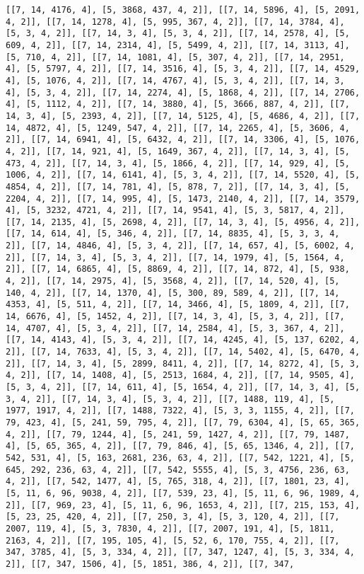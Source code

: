 \documentclass[12pt,fleqn]{article}\usepackage{../../common}
\begin{document}
\begin{verbatim}
[[7, 14, 4176, 4], [5, 3868, 437, 4, 2]], [[7, 14, 5896, 4], [5, 2091, 4, 2]], [[7, 14, 1278, 4], [5, 995, 367, 4, 2]], [[7, 14, 3784, 4], [5, 3, 4, 2]], [[7, 14, 3, 4], [5, 3, 4, 2]], [[7, 14, 2578, 4], [5, 609, 4, 2]], [[7, 14, 2314, 4], [5, 5499, 4, 2]], [[7, 14, 3113, 4], [5, 710, 4, 2]], [[7, 14, 1081, 4], [5, 307, 4, 2]], [[7, 14, 2951, 4], [5, 5797, 4, 2]], [[7, 14, 3516, 4], [5, 3, 4, 2]], [[7, 14, 4529, 4], [5, 1076, 4, 2]], [[7, 14, 4767, 4], [5, 3, 4, 2]], [[7, 14, 3, 4], [5, 3, 4, 2]], [[7, 14, 2274, 4], [5, 1868, 4, 2]], [[7, 14, 2706, 4], [5, 1112, 4, 2]], [[7, 14, 3880, 4], [5, 3666, 887, 4, 2]], [[7, 14, 3, 4], [5, 2393, 4, 2]], [[7, 14, 5125, 4], [5, 4686, 4, 2]], [[7, 14, 4872, 4], [5, 1249, 547, 4, 2]], [[7, 14, 2265, 4], [5, 3606, 4, 2]], [[7, 14, 6941, 4], [5, 6432, 4, 2]], [[7, 14, 3306, 4], [5, 1076, 4, 2]], [[7, 14, 921, 4], [5, 1649, 367, 4, 2]], [[7, 14, 3, 4], [5, 473, 4, 2]], [[7, 14, 3, 4], [5, 1866, 4, 2]], [[7, 14, 929, 4], [5, 1006, 4, 2]], [[7, 14, 6141, 4], [5, 3, 4, 2]], [[7, 14, 5520, 4], [5, 4854, 4, 2]], [[7, 14, 781, 4], [5, 878, 7, 2]], [[7, 14, 3, 4], [5, 2204, 4, 2]], [[7, 14, 995, 4], [5, 1473, 2140, 4, 2]], [[7, 14, 3579, 4], [5, 3232, 4721, 4, 2]], [[7, 14, 9541, 4], [5, 3, 5817, 4, 2]], [[7, 14, 2135, 4], [5, 2698, 4, 2]], [[7, 14, 3, 4], [5, 4956, 4, 2]], [[7, 14, 614, 4], [5, 346, 4, 2]], [[7, 14, 8835, 4], [5, 3, 3, 4, 2]], [[7, 14, 4846, 4], [5, 3, 4, 2]], [[7, 14, 657, 4], [5, 6002, 4, 2]], [[7, 14, 3, 4], [5, 3, 4, 2]], [[7, 14, 1979, 4], [5, 1564, 4, 2]], [[7, 14, 6865, 4], [5, 8869, 4, 2]], [[7, 14, 872, 4], [5, 938, 4, 2]], [[7, 14, 2975, 4], [5, 3568, 4, 2]], [[7, 14, 520, 4], [5, 140, 4, 2]], [[7, 14, 1370, 4], [5, 300, 89, 589, 4, 2]], [[7, 14, 4353, 4], [5, 511, 4, 2]], [[7, 14, 3466, 4], [5, 1809, 4, 2]], [[7, 14, 6676, 4], [5, 1452, 4, 2]], [[7, 14, 3, 4], [5, 3, 4, 2]], [[7, 14, 4707, 4], [5, 3, 4, 2]], [[7, 14, 2584, 4], [5, 3, 367, 4, 2]], [[7, 14, 4143, 4], [5, 3, 4, 2]], [[7, 14, 4245, 4], [5, 137, 6202, 4, 2]], [[7, 14, 7633, 4], [5, 3, 4, 2]], [[7, 14, 5402, 4], [5, 6470, 4, 2]], [[7, 14, 3, 4], [5, 2899, 8411, 4, 2]], [[7, 14, 8272, 4], [5, 3, 4, 2]], [[7, 14, 1408, 4], [5, 2513, 1684, 4, 2]], [[7, 14, 9505, 4], [5, 3, 4, 2]], [[7, 14, 611, 4], [5, 1654, 4, 2]], [[7, 14, 3, 4], [5, 3, 4, 2]], [[7, 14, 3, 4], [5, 3, 4, 2]], [[7, 1488, 119, 4], [5, 1977, 1917, 4, 2]], [[7, 1488, 7322, 4], [5, 3, 3, 1155, 4, 2]], [[7, 79, 423, 4], [5, 241, 59, 795, 4, 2]], [[7, 79, 6304, 4], [5, 65, 365, 4, 2]], [[7, 79, 1244, 4], [5, 241, 59, 1427, 4, 2]], [[7, 79, 1487, 4], [5, 65, 365, 4, 2]], [[7, 79, 846, 4], [5, 65, 1346, 4, 2]], [[7, 542, 531, 4], [5, 163, 2681, 236, 63, 4, 2]], [[7, 542, 1221, 4], [5, 645, 292, 236, 63, 4, 2]], [[7, 542, 5555, 4], [5, 3, 4756, 236, 63, 4, 2]], [[7, 542, 1477, 4], [5, 765, 318, 4, 2]], [[7, 1801, 23, 4], [5, 11, 6, 96, 9038, 4, 2]], [[7, 539, 23, 4], [5, 11, 6, 96, 1989, 4, 2]], [[7, 969, 23, 4], [5, 11, 6, 96, 1653, 4, 2]], [[7, 215, 153, 4], [5, 23, 25, 420, 4, 2]], [[7, 250, 3, 4], [5, 3, 120, 4, 2]], [[7, 2007, 119, 4], [5, 3, 7830, 4, 2]], [[7, 2007, 191, 4], [5, 1811, 2163, 4, 2]], [[7, 195, 105, 4], [5, 52, 6, 170, 755, 4, 2]], [[7, 347, 3785, 4], [5, 3, 334, 4, 2]], [[7, 347, 1247, 4], [5, 3, 334, 4, 2]], [[7, 347, 1506, 4], [5, 1851, 386, 4, 2]], [[7, 347, 
\end{verbatim}
\end{document}
